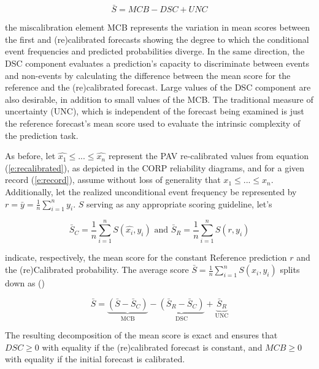 \documentclass[a4paper,12pt]{article}
\numberwithin{equation}{section}
\begin{document}
      \begin{equation} \label{e:sdecomposition} 
      \bar{S} = MCB -DSC + UNC 
      \end{equation}


      the miscalibration element MCB represents the variation in mean scores between the first and (re)calibrated forecasts showing the degree to which the conditional event frequencies and predicted probabilities diverge. In the same direction, the DSC component evaluates a prediction's capacity to discriminate between events and non-events by calculating the difference between the mean score for the reference and the (re)calibrated forecast. Large values of the DSC component are also desirable, in addition to small values of the MCB. The traditional measure of uncertainty (UNC), which is independent of the forecast being examined is just the reference forecast's mean score used to evaluate the intrinsic complexity of the prediction task.\bigskip

      As before, let $\hat{x_{1}} \leq ... \leq \hat{x_{n}}$ represent the PAV re-calibrated values from equation (\ref{e:recalibrated}), as depicted in the CORP reliability diagrams, and for a given record (\ref{e:record}), assume without loss of generality that $x_{1} \leq ... \leq x_{n}$. Additionally, let the realized unconditional event frequency be represented by $r = \bar{y} = \frac{1}{n} \sum_{i=1}^{n} y_{i}$. $S$ serving as any appropriate scoring guideline, let's 

      \begin{equation} \label{e:scoring}
      \bar{S}_{C} = \frac{1}{n} \sum_{i=1}^{n} S(\hat{x_{i}},y_{i}) \text{ and } \bar{S}_{R} = \frac{1}{n} \sum_{i=1}^{n} S(r,y_{i})
      \end{equation}

      indicate, respectively, the mean score for the constant Reference prediction $r$ and the (re)Calibrated probability. The average score $\bar{S} = \frac{1}{n} \sum_{i=1}^{n} S({x_{i}},y_{i})$ splits down as (\cite{roc1}) 

      \begin{equation} \label{e:dec_scoring}
      \bar{S} = \underbrace{(\bar{S} - \bar{S}_{C})}_{\text{MCB}} - \underbrace{(\bar{S}_{R} - \bar{S}_{C})}_{\text{DSC}} +  \underbrace{\bar{S}_{R}}_{\text{UNC}}
      \end{equation}

      The resulting decomposition of the mean score is exact and ensures that $DSC \geq 0$ with equality if the (re)calibrated forecast is constant, and $MCB \geq 0$  with equality if the initial forecast is calibrated.\bigskip
\end{document}

